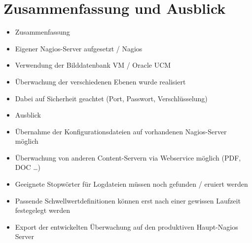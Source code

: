 \section{Zusammenfassung und Ausblick}
\begin{itemize}

\item Zusammenfassung
\item Eigener Nagios-Server aufgesetzt / Nagios
\item Verwendung der Bilddatenbank VM / Oracle UCM
\item Überwachung der verschiedenen Ebenen wurde realisiert
\item Dabei auf Sicherheit geachtet (Port, Passwort, Verschlüsselung)

\item Ausblick
\item Übernahme der Konfigurationsdateien auf vorhandenen Nagios-Server möglich
\item Überwachung von anderen Content-Servern via Webservice möglich (PDF, DOC …)


\item Geeignete Stopwörter für Logdateien müssen noch gefunden / eruiert werden
\item Passende Schwellwertdefinitionen können erst nach einer gewissen Laufzeit festegelegt werden
\item Export der entwickelten Überwachung auf den produktiven Haupt-Nagios Server
\end{itemize}